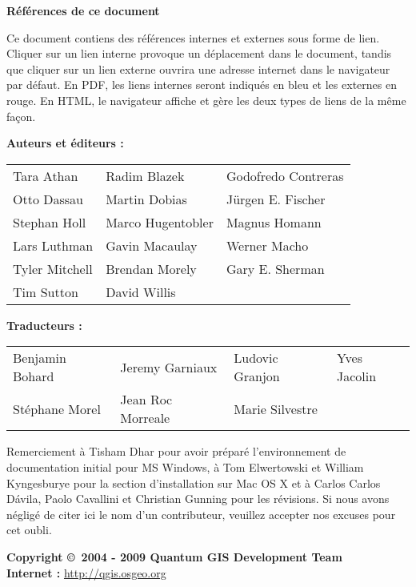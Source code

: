 \textbf{R\'ef\'erences de ce document}

Ce document contiens des r\'ef\'erences internes et externes sous forme de lien. Cliquer sur un lien interne provoque un d\'eplacement dans le document, tandis que cliquer sur un lien externe ouvrira une adresse internet dans le navigateur par d\'efaut. En PDF, les liens internes seront indiqu\'es en bleu et les externes en rouge. En HTML, le navigateur affiche et g\`ere les deux types de liens de la m\^eme fa\c{c}on.

\newpage

\begin{flushleft}
\textbf{Auteurs et \'editeurs :}
 
\begin{tabular}{p{5cm} p{5cm} p{5cm}}
Tara Athan & Radim Blazek & Godofredo Contreras \\
Otto Dassau & Martin Dobias & J\"urgen E. Fischer \\ 
Stephan Holl & Marco Hugentobler & Magnus Homann \\ 
Lars Luthman & Gavin Macaulay & Werner Macho \\
Tyler Mitchell & Brendan Morely & Gary E. Sherman \\ 
Tim Sutton & David Willis &  \\
\end{tabular}
\end{flushleft}

\begin{flushleft}
\textbf{Traducteurs :}
 
\begin{tabular}{p{5cm} p{5cm} p{5cm} p{5cm}}
Benjamin Bohard & Jeremy Garniaux & Ludovic Granjon & Yves Jacolin \\
St\'ephane Morel & Jean Roc Morreale & Marie Silvestre \\
\end{tabular}


Remerciement \`a Tisham Dhar pour avoir pr\'epar\'e l'environnement de documentation initial pour MS Windows, \`a Tom Elwertowski et William Kyngesburye pour la section d'installation sur Mac OS X et \`a Carlos Carlos D\'{a}vila, Paolo Cavallini et Christian Gunning pour les r\'evisions. Si nous avons n\'eglig\'e de citer ici le nom d'un contributeur, veuillez accepter nos excuses pour cet oubli.

\textbf{Copyright \copyright~2004 - 2009 Quantum GIS Development Team} \\
\textbf{Internet :} \url{http://qgis.osgeo.org}
\end{flushleft}

